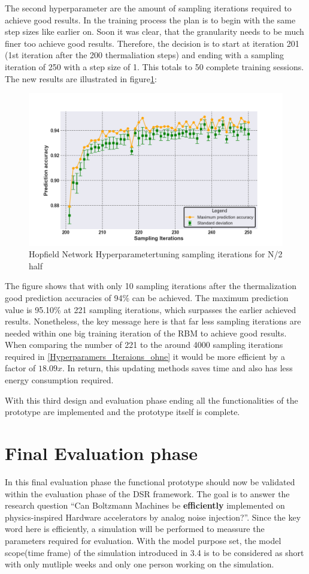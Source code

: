 The second hyperparameter are the amount of sampling iterations required to achieve good results. 
In the training process the plan is to begin with the same step sizes like earlier on. Soon it was clear,
that the granularity needs to be much finer too achieve good results. 
Therefore, the decision is to start at iteration 201 (1st iteration after the 200 thermaliation steps) and ending with a sampling iteration of 250 with a step size of 1.
This totals to 50 complete training sessions. The new results are illustrated in figure\ref{Hyperparamers_Iteraions_mit}:
\begin{figure}[H]
    \centering
    \includegraphics[width=0.9\linewidth]{graphics/Iterations_MIT_N2_Half_Pred_Acc.png}
    \caption{Hopfield Network Hyperparametertuning sampling iterations for N/2 half}
    \label{Hyperparamers_Iteraions_mit}
\end{figure}
The figure shows that with only 10 sampling iterations after the thermalization good prediction accuracies of 94\% can be achieved. 
The maximum prediction value is 95.10\% at 221 sampling iterations, which surpasses the earlier achieved results.
Nonetheless, the key message here is that far less sampling iterations are needed within one big training iteration of the \ac{RBM}
to achieve good results. 
When comparing the number of 221 to the around 4000 sampling iterations required in \ref{Hyperparamers_Iteraions_ohne} it would be more efficient by a factor of 
\(18.09x\). In return, this updating methods saves time and also has less energy consumption required.

With this third design and evaluation phase ending all the functionalities of the prototype are implemented and the prototype itself is complete. 

\section{Final Evaluation phase}
In this final evaluation phase the functional prototype should now be validated within the evaluation phase of the \ac{DSR} framework.
The goal is to answer the research question ``Can Boltzmann Machines be \textbf{efficiently} implemented on physics-inspired
Hardware accelerators by analog noise injection?''.
Since the key word here is efficiently, a simulation will be performed to meassure the parameters required for evaluation.
With the model purpose set, the model scope(time frame) of the simulation introduced in 3.4 is to be considered as short with only mutliple weeks and only one person working on the simulation. 

